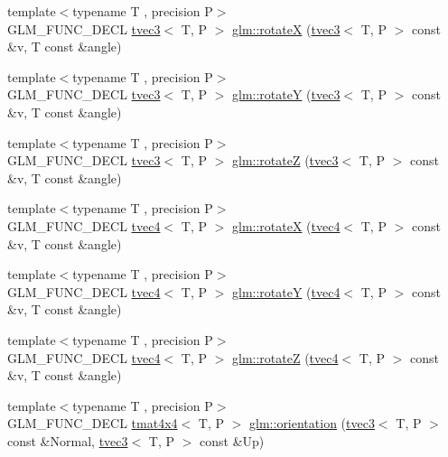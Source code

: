 \begin{DoxyCompactItemize}
{\footnotesize template$<$typename T , precision P$>$ }\\G\+L\+M\+\_\+\+F\+U\+N\+C\+\_\+\+D\+E\+CL \hyperlink{structglm_1_1tvec3}{tvec3}$<$ T, P $>$ \hyperlink{group__gtx__rotate__vector_ga0c2dc9f8507bffcbb957db9818b18508}{glm\+::rotateX} (\hyperlink{structglm_1_1tvec3}{tvec3}$<$ T, P $>$ const \&v, T const \&angle)
\item 
{\footnotesize template$<$typename T , precision P$>$ }\\G\+L\+M\+\_\+\+F\+U\+N\+C\+\_\+\+D\+E\+CL \hyperlink{structglm_1_1tvec3}{tvec3}$<$ T, P $>$ \hyperlink{group__gtx__rotate__vector_gabb5d19eba5befeebcb35a0aad4a114e3}{glm\+::rotateY} (\hyperlink{structglm_1_1tvec3}{tvec3}$<$ T, P $>$ const \&v, T const \&angle)
\item 
{\footnotesize template$<$typename T , precision P$>$ }\\G\+L\+M\+\_\+\+F\+U\+N\+C\+\_\+\+D\+E\+CL \hyperlink{structglm_1_1tvec3}{tvec3}$<$ T, P $>$ \hyperlink{group__gtx__rotate__vector_gae30ac01b89d4f16a972fee696c964908}{glm\+::rotateZ} (\hyperlink{structglm_1_1tvec3}{tvec3}$<$ T, P $>$ const \&v, T const \&angle)
\item 
{\footnotesize template$<$typename T , precision P$>$ }\\G\+L\+M\+\_\+\+F\+U\+N\+C\+\_\+\+D\+E\+CL \hyperlink{structglm_1_1tvec4}{tvec4}$<$ T, P $>$ \hyperlink{group__gtx__rotate__vector_gadab312d430a564741ae02215255027a0}{glm\+::rotateX} (\hyperlink{structglm_1_1tvec4}{tvec4}$<$ T, P $>$ const \&v, T const \&angle)
\item 
{\footnotesize template$<$typename T , precision P$>$ }\\G\+L\+M\+\_\+\+F\+U\+N\+C\+\_\+\+D\+E\+CL \hyperlink{structglm_1_1tvec4}{tvec4}$<$ T, P $>$ \hyperlink{group__gtx__rotate__vector_gae2507577c4bffa3548b32852791dd90c}{glm\+::rotateY} (\hyperlink{structglm_1_1tvec4}{tvec4}$<$ T, P $>$ const \&v, T const \&angle)
\item 
{\footnotesize template$<$typename T , precision P$>$ }\\G\+L\+M\+\_\+\+F\+U\+N\+C\+\_\+\+D\+E\+CL \hyperlink{structglm_1_1tvec4}{tvec4}$<$ T, P $>$ \hyperlink{group__gtx__rotate__vector_ga034e5d197ab4bd8685624bc2cf16e586}{glm\+::rotateZ} (\hyperlink{structglm_1_1tvec4}{tvec4}$<$ T, P $>$ const \&v, T const \&angle)
\item 
{\footnotesize template$<$typename T , precision P$>$ }\\G\+L\+M\+\_\+\+F\+U\+N\+C\+\_\+\+D\+E\+CL \hyperlink{structglm_1_1tmat4x4}{tmat4x4}$<$ T, P $>$ \hyperlink{group__gtx__rotate__vector_ga49b4d082305cdfcfe0a5c184f684a902}{glm\+::orientation} (\hyperlink{structglm_1_1tvec3}{tvec3}$<$ T, P $>$ const \&Normal, \hyperlink{structglm_1_1tvec3}{tvec3}$<$ T, P $>$ const \&Up)
\end{DoxyCompactItemize}


